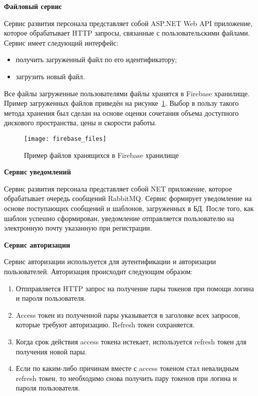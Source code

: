 \bigskip
\textbf{Файловый сервис}

Сервис развития персонала представляет собой ASP.NET Web API приложение, которое обрабатывает HTTP запросы, связанные с пользовательскими файлами. Сервис имеет следующий интерфейс:

\begin{itemize}
    \item получить загруженный файл по его идентификатору;
    \item загрузить новый файл.
\end{itemize}

Все файлы загруженные пользователями файлы хранятся в Firebase хранилище. Пример загруженных файлов приведён на рисунке~\ref{fig:firebase_files}. Выбор в пользу такого метода хранения был сделан на основе оценки сочетания объема доступного дискового пространства, цены и скорости работы.

\begin{figure}[ht]
    \centering
    \texttt{[image: firebase\_files]}
    \caption{Пример файлов хранящихся в Firebase хранилище}\label{fig:firebase_files}
\end{figure}

\bigskip
\textbf{Сервис уведомлений}

Сервис развития персонала представляет собой NET приложение, которое обрабатывает очередь сообщений RabbitMQ. Сервис формирует уведомление на основе поступающих сообщений и шаблонов, загруженных в БД. После того, как шаблон успешно сформирован, уведомление отправляется пользователю на электронную почту указанную при регистрации.

\bigskip
\textbf{Сервис авторизации}

Сервис авторизации используется для аутентификации и авторизации пользователей. Авторизация происходит следующим образом:

\begin{enumerate}
    \item Отпправляется HTTP запрос на получение пары токенов при помощи логина и пароля пользователя.
    \item Access токен из полученной пары указывается в заголовке всех запросов, которые требуют авторизацию. Refresh токен сохраняется.
    \item Когда срок действия access токена истекает, используется refresh токен для получения новой пары.
    \item Если по каким-либо причинам вместе с access токеном стал невалидным refresh токен, то необходимо снова получить пару токенов при логина и пароля пользователя.
\end{enumerate}

